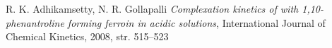 \documentclass[12pt]{article}
\begin{document}

\begin{thebibliography}{9}
R. K. Adhikamsetty, N. R. Gollapalli \emph{Complexation kinetics of  with 1,10-phenantroline forming ferroin in acidic solutions}, International Journal of Chemical Kinetics, 2008, str. 515--523
\end{thebibliography}
\end{document}
